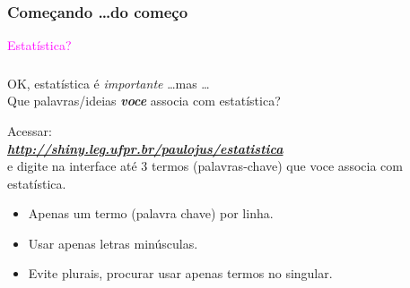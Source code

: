 \documentclass[handout,serif, professionalfont, usenames, dvipsnames, aspectratio = 169]{beamer}\usepackage[]{graphicx}\usepackage[]{color}
\begin{document}
\begin{frame}[plain]
  \frametitle{Começando \ldots do começo}
  \begin{center}
    \LARGE{\textcolor{Magenta}{Estatística?}}
  \end{center}
   \frametitle{}
  OK, estatística é \textit{importante} \ldots mas \ldots
  \\
  Que palavras/ideias \textbf{\it voce} associa com estatística?
\vspace{1cm}

Acessar: \\
\textit{\href{http://shiny.leg.ufpr.br/paulojus/estatistica}{\bf http://shiny.leg.ufpr.br/paulojus/estatistica}}\\
e digite na interface até 3 termos (palavras-chave) que voce associa com estatística.

\begin{itemize}
   \item Apenas um termo (palavra chave) por linha.
   \item Usar apenas letras minúsculas.
   \item Evite plurais, procurar usar apenas termos no singular.
 \end{itemize}
\end{frame}




\end{document}
